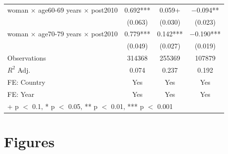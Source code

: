 \documentclass[12pt]{article}
\begin{document}
\begin{table}[H]
\begin{tabular}[t]{lccc}
    woman × age60-69 years × post2010 & \num{0.692}*** & \num{0.059}+ & \num{-0.094}**\\
     & (\num{0.063}) & (\num{0.030}) & (\num{0.023})\\
    woman × age70-79 years × post2010 & \num{0.779}*** & \num{0.142}*** & \num{-0.190}***\\
     & (\num{0.049}) & (\num{0.027}) & (\num{0.019})\\
    \midrule
    Observations & \num{314368} & \num{255369} & \num{107879}\\
    $R^2$ Adj. & \num{0.074} & \num{0.237} & \num{0.192}\\
    FE: Country & Yes & Yes & Yes\\
    FE: Year & Yes & Yes & Yes\\
    \bottomrule
    \multicolumn{4}{l}{\rule{0pt}{1em}+ p $<$ 0.1, * p $<$ 0.05, ** p $<$ 0.01, *** p $<$ 0.001}\\
\end{tabular}
\end{table}

\clearpage

\section*{Figures} \label{sec:fig}
\end{document}
